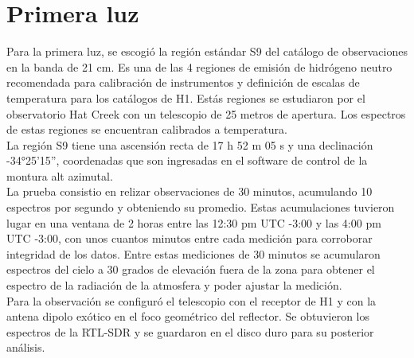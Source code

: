 \section{Primera luz}

Para la primera luz, se escogió la región estándar S9 del catálogo de observaciones en la banda de 21 cm. Es una de las 4 regiones de emisión de hidrógeno neutro recomendada para calibración de instrumentos y definición de escalas de temperatura para los catálogos de H1. Estás regiones se estudiaron por el observatorio Hat Creek con un telescopio de 25 metros de apertura. Los espectros de estas regiones se encuentran calibrados a temperatura.\\

La región S9 tiene una ascensión recta de 17 h 52 m 05 s y una declinación -34°25'15'', coordenadas que son ingresadas en el software de control de la montura alt azimutal.\\

La prueba consistio en relizar observaciones de 30 minutos, acumulando 10 espectros por segundo y obteniendo su promedio. Estas acumulaciones tuvieron lugar en una ventana de 2 horas entre las 12:30 pm UTC -3:00 y las 4:00 pm UTC -3:00, con unos cuantos minutos entre cada medición para corroborar integridad de los datos. Entre estas mediciones de 30 minutos se acumularon espectros del cielo a 30 grados de elevación fuera de la zona para obtener el espectro de la radiación de la atmosfera y poder ajustar la medición.\\

Para la observación se configuró el telescopio con el receptor de H1 y con la antena dipolo exótico en el foco geométrico del reflector. Se obtuvieron los espectros de la RTL-SDR y se guardaron en el disco duro para su posterior análisis.\\